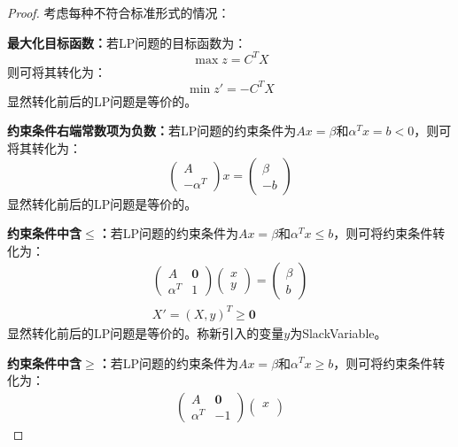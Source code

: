 \begin{proof}
	考虑每种不符合标准形式的情况：\par
	\textbf{最大化目标函数：}若LP问题的目标函数为：
	\begin{equation*}
		\max z=C^TX
	\end{equation*}
	则可将其转化为：
	\begin{equation*}
		\min z'=-C^TX
	\end{equation*}
	显然转化前后的LP问题是等价的。\par
	\textbf{约束条件右端常数项为负数：}若LP问题的约束条件为$Ax=\beta$和$\alpha^Tx=b<0$，则可将其转化为：
	\begin{equation*}
		\begin{pmatrix}
			A \\
			-\alpha^T
		\end{pmatrix}
		x
		=
		\begin{pmatrix}
			\beta \\
			-b
		\end{pmatrix}
	\end{equation*}
	显然转化前后的LP问题是等价的。\par
	\textbf{约束条件中含$\leqslant$：}若LP问题的约束条件为$Ax=\beta$和$\alpha^Tx\leqslant b$，则可将约束条件转化为：
	\begin{gather*}
		\begin{pmatrix}
			A & \mathbf{0} \\
			\alpha^T & 1
		\end{pmatrix}
		\begin{pmatrix}
			x \\
			y
		\end{pmatrix}
		=
		\begin{pmatrix}
			\beta \\
			b
		\end{pmatrix} \\
		X'=(X,y)^T\geqslant\mathbf{0}
	\end{gather*}
	显然转化前后的LP问题是等价的。称新引入的变量$y$为\gls{SlackVariable}。\par
	\textbf{约束条件中含$\geqslant$：}若LP问题的约束条件为$Ax=\beta$和$\alpha^Tx\geqslant b$，则可将约束条件转化为：
	\begin{gather*}
		\begin{pmatrix}
			A & \mathbf{0} \\
			\alpha^T & -1
		\end{pmatrix}
		\begin{pmatrix}
			x \\

\end{pmatrix}
\end{gather*}
\end{proof}
